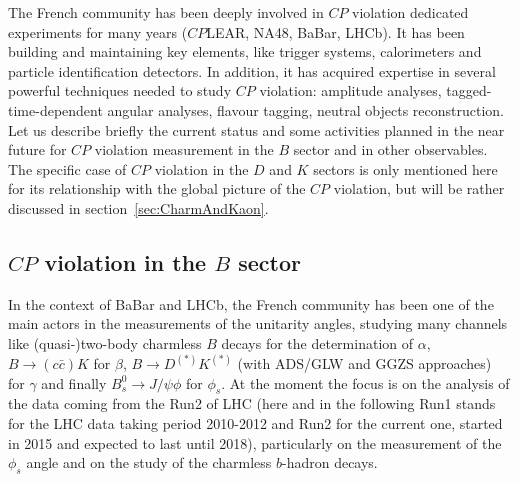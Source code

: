 The French community has been deeply involved in $CP$ violation dedicated experiments for
many years ($CP$LEAR, NA48, BaBar, LHCb). It has been building and maintaining key
elements, like trigger systems, calorimeters and particle identification detectors.  In addition, it has acquired expertise in
several powerful techniques needed to study $CP$ violation: amplitude analyses, tagged-time-dependent
angular analyses, flavour tagging, neutral objects reconstruction.  Let us describe
briefly the current status and some activities planned in the near future for $CP$ violation measurement in the $B$ sector and in other observables. The specific case of $CP$ violation in the $D$ and $K$ sectors is only mentioned here for its relationship with the global picture of the $CP$ violation, but will be rather discussed in section~\ref{sec:CharmAndKaon}. 

\subsection*{$CP$ violation in the $B$ sector}
In the context of BaBar and LHCb, the French community has been one of the main actors in the measurements of the unitarity angles,  studying many channels like (quasi-)two-body charmless $B$ decays for the determination of $\alpha$, $B \to (c\bar{c}) K$ for  $\beta$,  $B \to D^{(*)} K^{(*)}$ (with ADS/GLW and GGZS approaches) for $\gamma$ and finally $B^{0}_{s} \to J/\psi\phi$ for $\phi_{s}$.   
At the moment the focus is on the analysis of the data coming from the Run2 of LHC (here and in the following Run1 stands for the LHC data taking period  2010-2012 and  Run2 for the current one, started in 2015 and expected to last until 2018), particularly on the measurement of the $\phi_{s}$ angle and on the study of the charmless $b$-hadron decays. 


